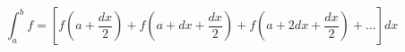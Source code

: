 \documentclass[12pt]{amsart}
\begin{document}
\sicpsize
\[
\int_a^{b} f = \left[ f \left( a + \frac{dx}{2} \right) + f \left( a + dx + \frac{dx}{2} \right) + f \left( a + 2dx + \frac{dx}{2} \right) + ... \right] dx
\]
\end{document}
